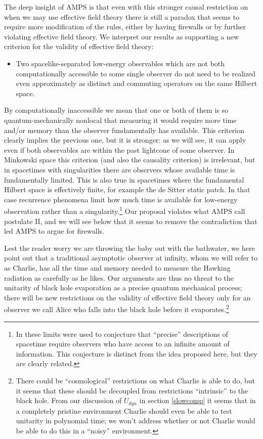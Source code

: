 \documentclass[12pt]{article}
\begin{document}
The deep insight of AMPS is that even with this stronger causal restriction on when we may use effective field theory there is still a paradox that seems to require more modification of the rules, either by having firewalls or by further violating effective field theory.  We interpret our results as supporting a new criterion for the validity of effective field theory: 
\begin{itemize} 
\item Two spacelike-separated low-energy observables which are not both computationally accessible to some single observer do not need to be realized even approximately as distinct and commuting operators on the same Hilbert space.  
\end{itemize}
By computationally inaccessible we mean that one or both of them is so quantum-mechanically nonlocal that measuring it would require more time and/or memory than the observer fundamentally has available.  This criterion clearly implies the previous one, but it is stronger: as we will see, it can apply even if both observables are within the past lightcone of some observer.  In Minkowski space this criterion (and also the causality criterion) is irrelevant, but in spacetimes with singularities there are observers whose available time is fundamentally limited.  This is also true in spacetimes where the fundamental Hilbert space is effectively finite, for example the de Sitter static patch.  In that case recurrence phenomena limit how much time is available for low-energy observation rather than a singularity.\footnote{In \cite{harlowsuss} these limits were used to conjecture that ``precise'' descriptions of spacetime require observers who have access to an infinite amount of information.  This conjecture is distinct from the idea proposed here, but they are clearly related.}  Our proposal violates what AMPS call postulate II, and we will see below that it seems to remove the contradiction that led AMPS to argue for firewalls.  

Lest the reader worry we are throwing the baby out with the bathwater, we here point out that a traditional asymptotic observer at infinity, whom we will refer to as Charlie, has all the time and memory needed to measure the Hawking radiation as carefully as he likes.  Our arguments are thus no threat to the unitarity of black hole evaporation as a precise quantum mechanical process; there will be new restrictions on the validity of effective field theory only for an observer we call Alice who falls into the black hole before it evaporates.\footnote{There could be ``cosmological'' restrictions on what Charlie is able to do, but it seems that these should be decoupled from restrictions ``intrinsic'' to the black hole.  From our discussion of $U_{dyn}$ in section \ref{slowcomp} it seems that in a completely pristine environment Charlie should even be able to test unitarity in polynomial time; we won't address whether or not Charlie would be able to do this in a ``noisy'' environment.}  
\end{document}
